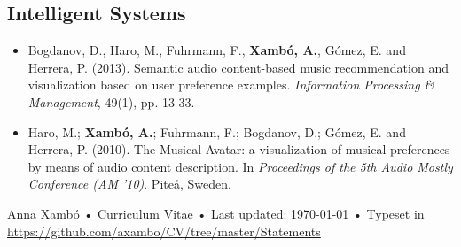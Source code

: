 \documentclass[10pt, a4paper]{article}
\begin{document}
\subsection*{Intelligent Systems}

\begin{itemize}
\item Bogdanov, D., Haro, M., Fuhrmann, F., \textbf{Xambó, A.}, Gómez, E. and Herrera, P. (2013). Semantic audio content-based music recommendation and visualization based on user preference examples. \emph{Information Processing \& Management}, 49(1), pp. 13-33.
\item Haro, M.; \textbf{Xambó, A.}; Fuhrmann, F.; Bogdanov, D.; Gómez, E. and Herrera, P. (2010). The Musical Avatar: a visualization of musical preferences by means of audio content description. In \emph{Proceedings of the 5th Audio Mostly Conference (AM '10)}. Piteå, Sweden.
\end{itemize}

\vfill{}

\begin{center}
{\scriptsize  Anna Xambó •\- Curriculum Vitae •\- Last updated: \today\- •\- %
Typeset in \href{http://nitens.org/taraborelli/cvtex}{
\XeTeX }\\
\href{https://github.com/axambo/CV/tree/master/Statements}{https://github.com/axambo/CV/tree/master/Statements}}
\end{center}
\end{document}
